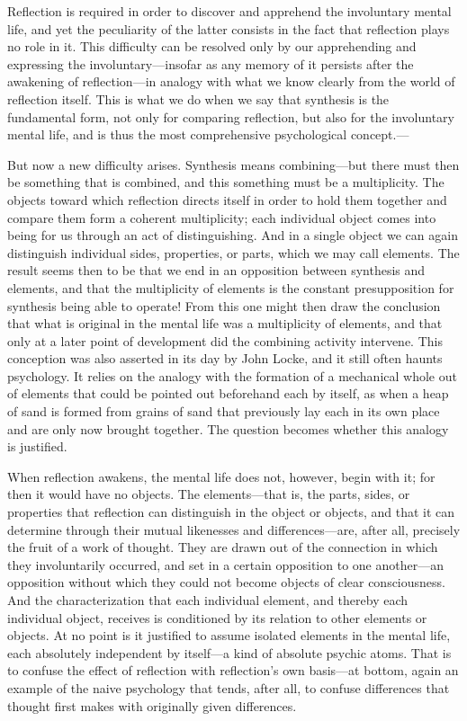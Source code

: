 \documentclass[12pt,a4paper]{book}
\newcommand{\opage}[1]{\marginnote{\footnotesize\textit{[#1]}}}
\begin{document}
Reflection is required in order to discover and apprehend the
involuntary mental life, and yet the peculiarity of the latter consists
in the fact that reflection plays no role in it. This difficulty can be
resolved only by our apprehending and expressing the
involuntary---insofar as any memory of it persists after the awakening
of reflection---in analogy with what we know clearly from the world of
reflection itself. This is what we do when we say that synthesis is the
fundamental form, not only for comparing reflection, but also for the
involuntary mental life, and is thus the most comprehensive
psychological concept.---

But now a new difficulty arises. Synthesis means combining---but there
must then be something that is combined, and this something must be a
multiplicity. The objects toward which reflection directs itself in
order to hold them together and \opage{12}compare them form a coherent
multiplicity; each individual object comes into being for us through an
act of distinguishing. And in a single object we can again distinguish
individual sides, properties, or parts, which we may call elements. The
result seems then to be that we end in an opposition between synthesis
and elements, and that the multiplicity of elements is the constant
presupposition for synthesis being able to operate! From this one might
then draw the conclusion that what is original in the mental life was a
multiplicity of elements, and that only at a later point of development
did the combining activity intervene. This conception was also asserted
in its day by John Locke, and it still often haunts psychology. It
relies on the analogy with the formation of a mechanical whole out of
elements that could be pointed out beforehand each by itself, as when a
heap of sand is formed from grains of sand that previously lay each in
its own place and are only now brought together. The question becomes
whether this analogy is justified.

When reflection awakens, the mental life does not, however, begin with
it; for then it would have no objects. The elements---that is, the
parts, sides, or properties that reflection can distinguish in the
object or objects, and that it can determine through their mutual
likenesses and differences---are, after all, precisely the fruit of a
work of thought. They are drawn out of the connection in which they
involuntarily occurred, and set in a certain opposition to one
another---an opposition without which they could not become objects of
clear consciousness. And the characterization that each individual
element, and thereby each individual object, receives is conditioned by
its relation to other elements or objects. At no point is it justified
to assume isolated elements in the mental life, each absolutely
independent by itself---a kind of absolute psychic atoms. That is to
confuse the effect of reflection with reflection's own basis---at
bottom, again an example of the naive psychology that tends, after all,
to confuse differences that thought first makes with originally given
differences.
\end{document}

